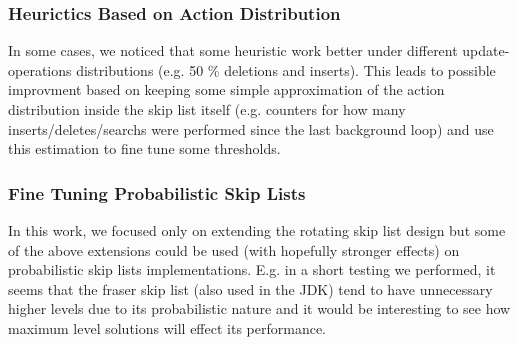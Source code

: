 \documentclass{article}
\begin{document}
\subsubsection{Heurictics Based on Action Distribution}
\label{sssec:fr-1}
In some cases, we noticed that some heuristic work better under different update-operations distributions (e.g. 50 \% deletions and inserts). This leads to possible improvment based on keeping some simple approximation of the action distribution inside the skip list itself (e.g. counters for how many inserts/deletes/searchs were performed since the last background loop) and use this estimation to fine tune some thresholds.

\subsubsection{Fine Tuning Probabilistic Skip Lists}
\label{sssec:fr-2}

In this work, we focused only on extending the rotating skip list design but some of the above extensions could be used (with hopefully stronger effects) on probabilistic skip lists implementations. E.g. in a short testing we performed, it seems that the fraser skip list (also used in the JDK) tend to have unnecessary higher levels due to its probabilistic nature and it would be interesting to see how maximum level solutions will effect its performance.






\end{document}
